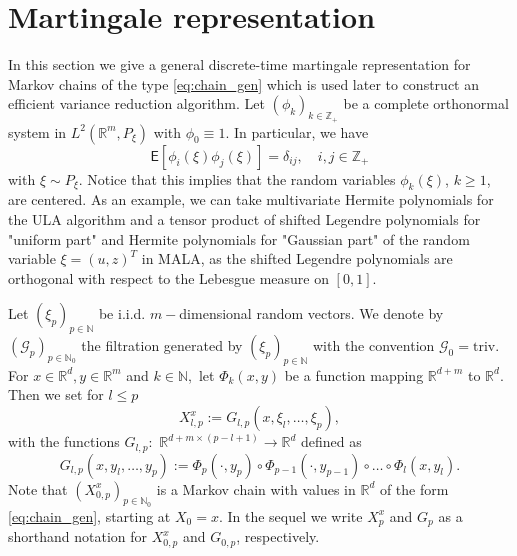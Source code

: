 \documentclass[bj]{imsart}
\def\nset{\mathbb{N}}
\def\rset{\mathbb{R}}
\def\rset{\mathbb{R}}
\begin{document}
\section{Martingale representation}
\label{seq:mart_repr}
In this section we give a general discrete-time martingale representation for  Markov chains of the type  \eqref{eq:chain_gen} which is  used later to construct an efficient variance reduction algorithm. Let \((\phi_k)_{k\in \mathbb{Z}_+}\) be a complete orthonormal system in \(L^2(\mathbb{R}^m, P_{\xi})\) with \(\phi_0\equiv 1\).  In particular, we have
\begin{equation*}
\mathsf{E}[\phi_i(\xi)\phi_j(\xi)]=\delta_{ij},\quad i,j\in  \mathbb{Z}_{+}
\end{equation*}
with \(\xi \sim P_{\xi}.\)
Notice that this implies that the random variables
$\phi_k(\xi)$, $k\ge1$, are centered. As an example, we can take  multivariate Hermite polynomials for the ULA algorithm and a tensor product of shifted Legendre polynomials for "uniform part" and Hermite polynomials for "Gaussian part"  of the random variable $\xi = (u, z)^T$ in MALA, as the shifted Legendre polynomials are orthogonal with respect to the Lebesgue measure on \([0,1].\)  
\par
Let  $(\xi_p)_{p \in \nset}$ be i.i.d. $m-$dimensional random vectors. We denote by $(\mathcal{G}_p)_{p \in \nset_0}$  the filtration generated by $(\xi_p)_{p \in \nset}$ with the convention $\mathcal{G}_0=\mathrm{triv}$. For  $x \in \rset^d, y \in \rset^{m}$ and $k \in \nset,$ let $\Phi_k(x,y)$ be a function mapping $\rset^{d+m}$ to $\rset^d$. Then we set for $l \le p$
\begin{equation}
\label{eq:ula_new}
X^x_{l,p}:=G_{l,p}(x,\xi_{l},\ldots,\xi_{p}),
\end{equation}
with the functions \(G_{l,p}:\) \(\rset^{d + m\times(p-l+1)}\to \rset^{d}\) defined as
\begin{equation}
\label{eq:definition-G-p-l}
G_{l,p}(x,y_l,\ldots,y_p):=\Phi_p(\cdot,y_{p})\circ\Phi_{p-1}(\cdot,y_{p-1})\circ\dots\circ\Phi_{l}(x,y_{l}).
\end{equation}
Note that $\left(X^x_{0,p}\right)_{p \in \nset_0}$ is a Markov chain with values in $\rset^d$ of the form \eqref{eq:chain_gen}, starting at $X_0 = x$. In the sequel we write $X^x_{p}$ and $G_{p}$ as a shorthand notation for $X^x_{0,p}$ and $G_{0,p}$, respectively. 
\end{document}
